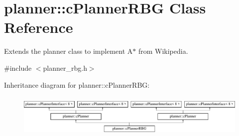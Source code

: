 \hypertarget{classplanner_1_1c_planner_r_b_g}{}\section{planner\+:\+:c\+Planner\+R\+BG Class Reference}
\label{classplanner_1_1c_planner_r_b_g}


Extends the planner class to implement A$\ast$ from Wikipedia.  




{\ttfamily \#include $<$planner\+\_\+rbg.\+h$>$}

Inheritance diagram for planner\+:\+:c\+Planner\+R\+BG\+:\begin{figure}[H]
\begin{center}
\leavevmode
\includegraphics[height=2.089552cm]{classplanner_1_1c_planner_r_b_g}
\end{center}
\end{figure}
